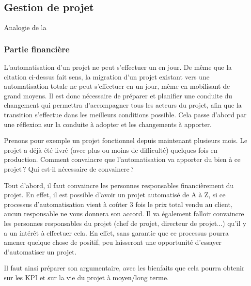 \subsection{Gestion de projet}

\epigraph{}{Analogie de la }

\subsubsection{Partie financière}
L'automatisation d'un projet ne peut s'effectuer un en jour. De même que la citation ci-dessus fait sens, la migration d'un projet existant vers une automatisation totale ne peut s'effectuer en un jour, même en mobilisant de grand moyens. Il est donc nécessaire de préparer et planifier une conduite du changement qui permettra d'accompagner tous les acteurs du projet, afin que la transition s'effectue dans les meilleurs conditions possible. Cela passe d'abord par une réflexion sur la conduite à adopter et les changements à apporter. 

Prenons pour exemple un projet fonctionnel depuis maintenant plusieurs mois. Le projet a déjà été livré (avec plus ou moins de difficulté) quelques fois en production. Comment convaincre que l'automatisation va apporter du bien à ce projet ? Qui est-il nécessaire de convaincre ?

Tout d'abord, il faut convaincre les personnes responsables financièrement du projet. En effet, il est possible d'avoir un projet automatisé de A à Z, si ce processus d'automatisation vient à coûter 3 fois le prix total vendu au client, aucun responsable ne vous donnera son accord. Il va également falloir convaincre les personnes responsables du projet (chef de projet, directeur de projet...) qu'il y a un intérêt à effectuer cela. En effet, sans garantie que ce processus pourra amener quelque chose de positif, peu laisseront une opportunité d'essayer d'automatiser un projet.

Il faut ainsi préparer son argumentaire, avec les bienfaits que cela pourra obtenir sur les \gls{KPI} et sur la vie du projet à moyen/long terme.

